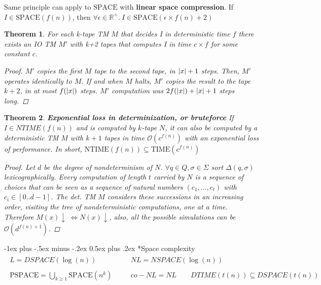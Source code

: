 \documentclass[10pt,landscape]{article}
\makeatletter
\newcommand{\conv}{\downarrow}
\newcommand{\R}{\mathbb{R}}
\newcommand{\SPACE}{\mathrm{SPACE}}
\newcommand{\PSPACE}{\mathrm{PSPACE}}
\newcommand{\TIME}{\mathrm{TIME}}
\newcommand{\NTIME}{\mathrm{NTIME}}
\renewcommand{\O}{\mathcal{O}}
\DeclarePairedDelimiter\abs{\lvert}{\rvert}
\renewcommand{\iff}{\Leftrightarrow}
\theoremstyle{plain}%
\newtheorem*{thm}{Theorem}
\theoremstyle{definition}
\theoremstyle{remark}
\renewcommand{\section}{\@startsection{section}{1}{0mm}%
                                {-1ex plus -.5ex minus -.2ex}%
                                {0.5ex plus .2ex}%
                                {\normalfont\large\bfseries}}
\makeatother
\begin{document}
\begin{multicols}{3}
Same principle can apply to $\SPACE$ with \textbf{linear space compression}.
If $I \in \SPACE(f(n))$, then $\forall \epsilon \in \R^+  . \ I \in \SPACE(\epsilon \times f(n) + 2)$ 

\begin{thm}
    For each k-tape TM $M$ that decides I in deterministic time $f$ there exists
    an IO TM $M'$ with k+2 tapes that computes I in time $c \times f$ for some constant $c$.  

    \begin{proof}
        $M'$ copies the first $M$ tape to the second tape, in $\abs{x} + 1$ steps.
        Then, $M'$ operates identically to $M$. If and when $M$ halts,
        $M'$ copies the result to the tape $k+2$, in at most $f(\abs{x})$ steps.
        $M'$ computation was $2f(\abs{x}) + \abs{x} + 1$ steps long. 
    \end{proof}
\end{thm}
\begin{thm} \textbf{Exponential loss in determinization, or bruteforce}
    If $I \in NTIME(f(n))$ and is computed by $k$-tape $N$, it can also be computed by a deterministic 
    TM $M$ with $k+1$ tapes in
    time $\O(c^{f(n)})$ with 
    an exponential loss of performance. In short, $\NTIME(f(n)) \subseteq \TIME(c^{f(n)})$ 

    \begin{proof}
        Let $d$ be the degree of nondeterminism of $N$. 
        $\forall q \in Q, \sigma \in \Sigma$ sort $\Delta(q,\sigma)$ lexicographically.
        Every computation of length $t$ carried by $N$ is a sequence of choices that can
        be seen as a sequence of natural numbers $(c_1, \hdots, c_t)$ with $c_i \in [0..d-1]$.
        The det. TM $M$ considers these successions in an increasing order, visiting
        the tree of nondeterministic computations, one at a time.
        Therefore $M(x)\conv \ \iff N(x)\conv$, also, all the possible simulations
        can be $\O(d^{f(n) + 1})$.
    \end{proof}
\end{thm}
\section*{Space complexity}
\[ \begin{aligned}
            \begin{matrix}
           L=DSPACE(\log (n)) &\quad& NL = NSPACE(\log (n)) \\
            &&\\ 
            \PSPACE = \bigcup_{k\geq1} \SPACE(n^k) &\quad& co-NL=NL\qquad DTIME(t(n))\subseteq DSPACE(t(n))
            

\end{matrix}
\end{aligned}\]
\end{multicols}
\end{document}

